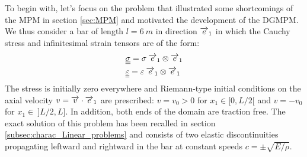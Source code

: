 To begin with, let's focus on the problem that illustrated some shortcomings of the MPM in section \ref{sec:MPM} and motivated the development of the DGMPM.
We thus consider a bar of length $l=6\:m$ in direction ${\overrightarrow{e}}_1$ in which the Cauchy stress and infinitesimal strain tensors are of the form:
\begin{align*}
  & {\underline{\underline{\sigma}}} = \sigma \: {\overrightarrow{e}}_1\otimes {\overrightarrow{e}}_1 \\
  & {\underline{\underline{\varepsilon}}} = \varepsilon \: {\overrightarrow{e}}_1\otimes {\overrightarrow{e}}_1
\end{align*}
The stress is initially zero everywhere and Riemann-type initial conditions on the axial velocity $v={\overrightarrow{v}}\cdot{\overrightarrow{e}}_1$ are prescribed: $v=v_0>0$ for $x_1\in [0,L/2[$ and $v=-v_0$ for $x_1\in \:]L/2,L]$. In addition, both ends of the domain are traction free.
The exact solution of this problem \cite[Ch.1]{Wang} has been recalled in section \ref{subsec:charac_Linear_problems} and consists of two elastic discontinuities propagating leftward and rightward in the bar at constant speeds $c=\pm\sqrt{E/\rho}$. 

